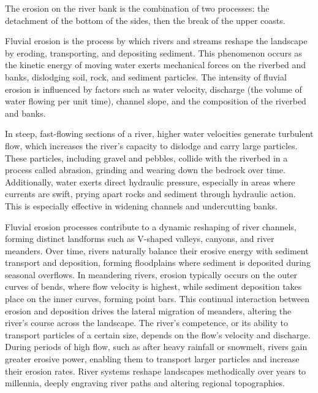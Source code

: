 {The erosion on the river bank is the combination of two processes: the detachment of the bottom of the sides, then the break of the upper coasts. }

Fluvial erosion is the process by which rivers and streams reshape the landscape by eroding, transporting, and depositing sediment. This phenomenon occurs as the kinetic energy of moving water exerts mechanical forces on the riverbed and banks, dislodging soil, rock, and sediment particles. The intensity of fluvial erosion is influenced by factors such as water velocity, discharge (the volume of water flowing per unit time), channel slope, and the composition of the riverbed and banks.

In steep, fast-flowing sections of a river, higher water velocities generate turbulent flow, which increases the river's capacity to dislodge and carry large particles. These particles, including gravel and pebbles, collide with the riverbed in a process called abrasion, grinding and wearing down the bedrock over time. Additionally, water exerts direct hydraulic pressure, especially in areas where currents are swift, prying apart rocks and sediment through hydraulic action. This is especially effective in widening channels and undercutting banks.

Fluvial erosion processes contribute to a dynamic reshaping of river channels, forming distinct landforms such as V-shaped valleys, canyons, and river meanders. Over time, rivers naturally balance their erosive energy with sediment transport and deposition, forming floodplains where sediment is deposited during seasonal overflows. In meandering rivers, erosion typically occurs on the outer curves of bends, where flow velocity is highest, while sediment deposition takes place on the inner curves, forming point bars. This continual interaction between erosion and deposition drives the lateral migration of meanders, altering the river's course across the landscape. The river's competence, or its ability to transport particles of a certain size, depends on the flow's velocity and discharge. During periods of high flow, such as after heavy rainfall or snowmelt, rivers gain greater erosive power, enabling them to transport larger particles and increase their erosion rates. River systems reshape landscapes methodically over years to millennia, deeply engraving river paths and altering regional topographies.


